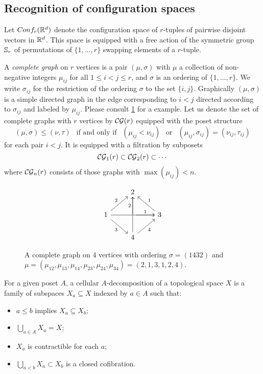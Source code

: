 \subsection{Recognition of configuration spaces}\label{ss:recognition}

Let $Conf_{r}(\mathbb{R}^{d})$ denote the configuration space of $r$-tuples of pairwise disjoint vectors in $\mathbb{R}^{d}$.
This space is equipped with a free action of the symmetric group $\mathbb{S}_r$ of permutations of $\{1,\dots,r\}$ swapping elements of a $r$-tuple.

\begin{definition}
	A \textit{complete graph} on $r$ vertices is a pair $(\mu,\sigma)$ with $\mu$ a collection of non-negative integers $\mu_{ij}$ for all $1 \leq i < j \leq r$, and $\sigma$ is an ordering of $\{1,\dots,r\}$.
	We write $\sigma_{ij}$ for the restriction of the ordering $\sigma$ to the set $\{i,j\}$.
	Graphically $(\mu,\sigma)$ is a simple directed graph in the edge corresponding to $i<j$ directed according to $\sigma_{ij}$ and labeled by $\mu_{ij}$.
	Please consult \cref{f:complete graph} for a example.
	Let us denote the set of complete graphs with $r$ vertices by $\mathcal{CG}(r)$ equipped with the poset structure
	\begin{equation*}
		(\mu,\sigma)\le (\nu,\tau) \ \ \text{ if and only if } \ \
		(\mu_{ij}<\nu_{ij}) \ \ \text{ or } \ \
		(\mu_{ij},\sigma_{ij})= (\nu_{ij},\tau_{ij})
	\end{equation*}
	for each pair $i<j$.
	It is equipped with a filtration by subposets
	\[
	\mathcal{CG}_1(r) \subset \mathcal{CG}_2(r) \subset \dotsb
	\]
	where $\mathcal{CG}_n(r)$ consists of those graphs with $\max(\mu_{ij})< n$.
\end{definition}

\begin{figure}
	\centering
	\begin{equation*}
		\begin{tikzcd}
			\ & 2 & \ \\
			1 \arrow[ur,"2"] \arrow[rr] \arrow[dr,"3"']& \arrow[r,"1"] \arrow[u,"2"] & 3 \arrow[ul,"1"'] \\
			\ & 4 \arrow[ur,"4"'] \arrow[uu] & \
		\end{tikzcd}
	\end{equation*}
	\caption{A complete graph on 4 vertices with ordering $\sigma=(1432)$ and $\mu=(\mu_{12},\mu_{13},\mu_{14},\mu_{23},\mu_{24},\mu_{34})=(2,1,3,1,2,4)$.}
	\label{f:complete graph}
\end{figure}

\begin{definition}
	For a given poset $A$, a cellular $A$-decomposition of a topological space $X$ is a family of subspaces $X_a \subseteq X$ indexed by $a \in A$ such that:
	\begin{itemize}
		\item $a \leq b$ implies $X_a \subseteq X_b$;
		\item $\bigcup_{a \in A} X_a = X$;
		\item $X_a$ is contractible for each $a$;
		\item $\bigcup_{a<b} X_a \subset X_b$ is a closed cofibration.
	\end{itemize}
\end{definition}

